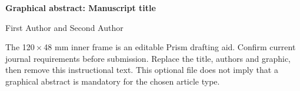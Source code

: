 \documentclass[a4paper,landscape,11pt]{article}
\begin{document}
\begin{center}
{\Large\bfseries Graphical abstract: Manuscript title\par}
\medskip
First Author and Second Author\par
\bigskip
{}
\end{center}
\medskip
The 120\,\(\times\)\,48 mm inner frame is an editable Prism drafting aid.
Confirm current journal requirements before submission. Replace the title,
authors and graphic, then remove this instructional text. This optional
file does not imply that a graphical abstract is mandatory for the chosen
article type.
\end{document}
